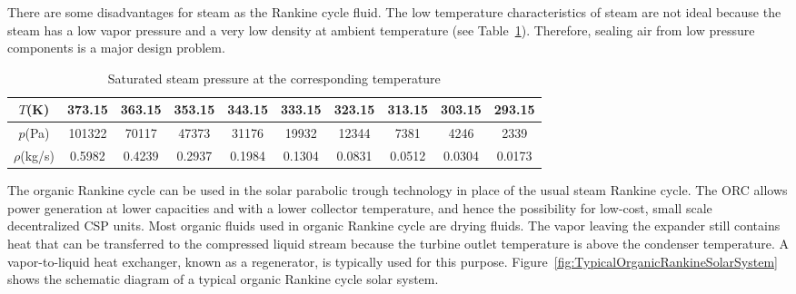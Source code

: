 There are some disadvantages for steam as the Rankine cycle fluid. The low temperature characteristics of steam are not ideal because the steam has a low vapor pressure and a very low density at ambient temperature (see Table~\ref{tab:waterT_P_D}). Therefore, sealing air from low pressure components is a major design problem.
\begin{table}[htbp]
	\caption{Saturated steam pressure at the corresponding temperature}
	\begin{center}
	\begin{tabular}{cccccccccc}
		\toprule	
		    $T$(K)    &	373.15	    &    363.15    &    353.15    &    343.15    &    333.15    &    323.15    &    313.15    &    303.15    &    293.15\\
		\midrule	
		    $p$(Pa)    &    101322        &    70117    &    47373    &    31176    &    19932    &    12344    &    7381    &    4246    &    2339\\
		    $\rho$(kg/s)    &    0.5982        &    0.4239    &    0.2937    &    0.1984    &    0.1304    &    0.0831    &    0.0512    &    0.0304    &    0.0173\\
		\bottomrule
	\end{tabular}
	\end{center}
	\label{tab:waterT_P_D}
\end{table}

The organic Rankine cycle can be used in the solar parabolic trough technology in place of the usual steam Rankine cycle. The ORC allows power generation at lower capacities and with a lower collector temperature, and hence the possibility for low-cost, small scale decentralized CSP units. Most organic fluids used in organic Rankine cycle are drying fluids. The vapor leaving the expander still contains heat that can be transferred to the compressed liquid stream because the turbine outlet temperature is above the condenser temperature. A vapor-to-liquid heat exchanger, known as a regenerator, is typically used for this purpose.
Figure~\ref{fig:TypicalOrganicRankineSolarSystem} shows the schematic diagram of a typical organic Rankine cycle solar system. 


